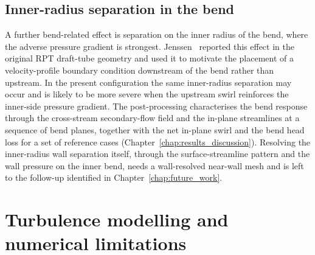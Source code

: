 \subsection{Inner-radius separation in the bend}
\label{sec:theory_bend_separation}
 
A further bend-related effect is separation on the inner radius of the bend, where the adverse pressure gradient is strongest. Jenssen~\cite{Jenssen2020} reported this effect in the original RPT draft-tube geometry and used it to motivate the placement of a velocity-profile boundary condition downstream of the bend rather than upstream. In the present configuration the same inner-radius separation may occur and is likely to be more severe when the upstream swirl reinforces the inner-side pressure gradient. The post-processing characterises the bend response through the cross-stream secondary-flow field and the in-plane streamlines at a sequence of bend planes, together with the net in-plane swirl and the bend head loss for a set of reference cases (Chapter~\ref{chap:results_discussion}). Resolving the inner-radius wall separation itself, through the surface-streamline pattern and the wall pressure on the inner bend, needs a wall-resolved near-wall mesh and is left to the follow-up identified in Chapter~\ref{chap:future_work}.
 
\section{Turbulence modelling and numerical limitations}
\label{sec:theory_turbulence}
 
